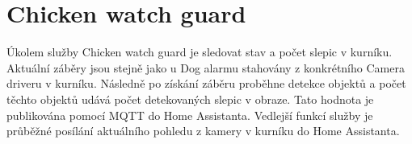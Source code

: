 \section{Chicken watch guard}\label{sec:chicken-watch-guard}
Úkolem služby Chicken watch guard je sledovat stav a počet slepic v kurníku.\newline
Aktuální záběry jsou stejně jako u Dog alarmu stahovány z konkrétního Camera driveru v kurníku.
Následně po získání záběru proběhne detekce objektů a počet těchto objektů udává počet detekovaných slepic v obraze.
Tato hodnota je publikována pomocí MQTT do Home Assistanta.
Vedlejší funkcí služby je průběžné posílání aktuálního pohledu z kamery v kurníku do Home Assistanta.